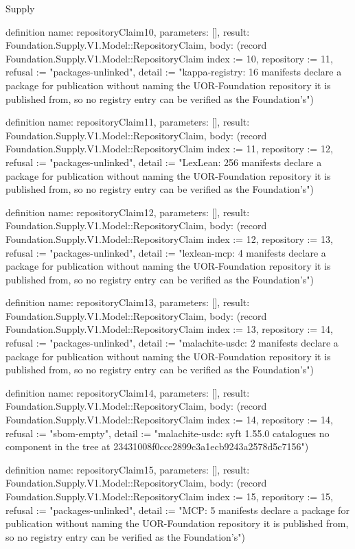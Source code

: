 \begin{lexlean}{Supply}
\begin{semanticmodule}
definition{
  name: repositoryClaim10,
  parameters: [],
  result: Foundation.Supply.V1.Model::RepositoryClaim,
  body: (record Foundation.Supply.V1.Model::RepositoryClaim {index := 10, repository := 11, refusal := "packages-unlinked", detail := "kappa-registry: 16 manifests declare a package for publication without naming the UOR-Foundation repository it is published from, so no registry entry can be verified as the Foundation's"})
}

definition{
  name: repositoryClaim11,
  parameters: [],
  result: Foundation.Supply.V1.Model::RepositoryClaim,
  body: (record Foundation.Supply.V1.Model::RepositoryClaim {index := 11, repository := 12, refusal := "packages-unlinked", detail := "LexLean: 256 manifests declare a package for publication without naming the UOR-Foundation repository it is published from, so no registry entry can be verified as the Foundation's"})
}

definition{
  name: repositoryClaim12,
  parameters: [],
  result: Foundation.Supply.V1.Model::RepositoryClaim,
  body: (record Foundation.Supply.V1.Model::RepositoryClaim {index := 12, repository := 13, refusal := "packages-unlinked", detail := "lexlean-mcp: 4 manifests declare a package for publication without naming the UOR-Foundation repository it is published from, so no registry entry can be verified as the Foundation's"})
}

definition{
  name: repositoryClaim13,
  parameters: [],
  result: Foundation.Supply.V1.Model::RepositoryClaim,
  body: (record Foundation.Supply.V1.Model::RepositoryClaim {index := 13, repository := 14, refusal := "packages-unlinked", detail := "malachite-usdc: 2 manifests declare a package for publication without naming the UOR-Foundation repository it is published from, so no registry entry can be verified as the Foundation's"})
}

definition{
  name: repositoryClaim14,
  parameters: [],
  result: Foundation.Supply.V1.Model::RepositoryClaim,
  body: (record Foundation.Supply.V1.Model::RepositoryClaim {index := 14, repository := 14, refusal := "sbom-empty", detail := "malachite-usdc: syft 1.55.0 catalogues no component in the tree at 23431008f0ccc2899c3a1ecb9243a2578d5c7156"})
}

definition{
  name: repositoryClaim15,
  parameters: [],
  result: Foundation.Supply.V1.Model::RepositoryClaim,
  body: (record Foundation.Supply.V1.Model::RepositoryClaim {index := 15, repository := 15, refusal := "packages-unlinked", detail := "MCP: 5 manifests declare a package for publication without naming the UOR-Foundation repository it is published from, so no registry entry can be verified as the Foundation's"})
}


\end{semanticmodule}
\end{lexlean}
